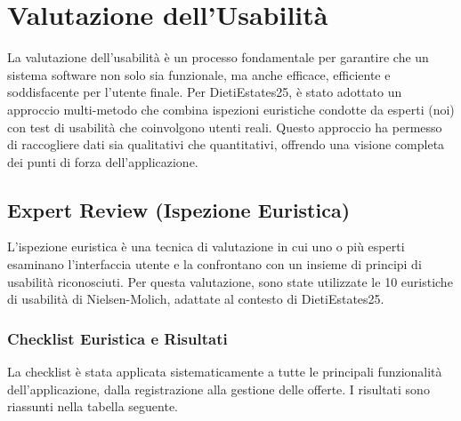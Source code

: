 \documentclass{book}
\begin{document}
\section{Valutazione dell'Usabilità}
La valutazione dell'usabilità è un processo fondamentale per garantire che un sistema software non solo sia funzionale, ma anche efficace, efficiente e soddisfacente per l'utente finale. Per DietiEstates25, è stato adottato un approccio multi-metodo che combina ispezioni euristiche condotte da esperti (noi) con test di usabilità che coinvolgono utenti reali. Questo approccio ha permesso di raccogliere dati sia qualitativi che quantitativi, offrendo una visione completa dei punti di forza dell'applicazione.

\subsection{Expert Review (Ispezione Euristica)}
L'ispezione euristica è una tecnica di valutazione in cui uno o più esperti esaminano l'interfaccia utente e la confrontano con un insieme di principi di usabilità riconosciuti. Per questa valutazione, sono state utilizzate le 10 euristiche di usabilità di Nielsen-Molich, adattate al contesto di DietiEstates25.

\subsubsection{Checklist Euristica e Risultati}
La checklist è stata applicata sistematicamente a tutte le principali funzionalità dell'applicazione, dalla registrazione alla gestione delle offerte. I risultati sono riassunti nella tabella seguente.
\end{document}
